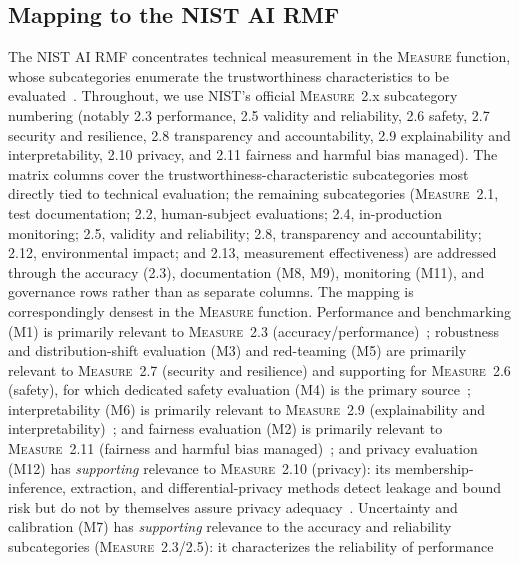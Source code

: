 

\subsection{Mapping to the NIST AI RMF}\label{sec:map-nist}
The NIST AI RMF concentrates technical measurement in the \textsc{Measure} function,
whose subcategories enumerate the trustworthiness characteristics to be
evaluated~\cite{nist2023airmf}. Throughout, we use NIST's official \textsc{Measure}~2.x
subcategory numbering (notably 2.3 performance, 2.5 validity and reliability, 2.6 safety,
2.7 security and resilience, 2.8 transparency and accountability, 2.9 explainability and
interpretability, 2.10 privacy, and 2.11 fairness and harmful bias managed). The matrix columns cover the
trustworthiness-characteristic subcategories most directly tied to technical evaluation;
the remaining subcategories (\textsc{Measure}~2.1, test
documentation; 2.2, human-subject evaluations; 2.4, in-production monitoring; 2.5,
validity and reliability; 2.8, transparency and accountability; 2.12, environmental
impact; and 2.13, measurement effectiveness) are addressed through the accuracy (2.3),
documentation (M8, M9), monitoring (M11), and governance rows rather than as separate
columns. The mapping is correspondingly densest in the \textsc{Measure} function.
Performance and benchmarking (M1) is primarily relevant to \textsc{Measure}~2.3
(accuracy/performance)~\cite{hendrycks2020mmlu,liang2023holistic}; robustness and
distribution-shift evaluation (M3) and red-teaming (M5) are primarily relevant to
\textsc{Measure}~2.7 (security and resilience) and supporting for \textsc{Measure}~2.6
(safety), for which dedicated safety evaluation (M4) is the primary
source~\cite{madry2018pgd,cohen2019certified,zou2023universal,mazeika2024harmbench};
interpretability (M6) is primarily relevant to \textsc{Measure}~2.9 (explainability and
interpretability)~\cite{lundberg2017shap,ribeiro2016lime}; and fairness evaluation (M2)
is primarily relevant to \textsc{Measure}~2.11 (fairness and harmful bias
managed)~\cite{parrish2022bbq,gallegos2024bias}; and privacy evaluation (M12)
has \emph{supporting} relevance to \textsc{Measure}~2.10 (privacy): its membership-inference,
extraction, and differential-privacy methods detect leakage and bound risk but do not by
themselves assure privacy adequacy~\cite{shokri2017membership,carlini2021extracting,abadi2016dp}.
Uncertainty and calibration (M7) has \emph{supporting} relevance to the accuracy and reliability
subcategories (\textsc{Measure}~2.3/2.5): it characterizes the reliability of performance
